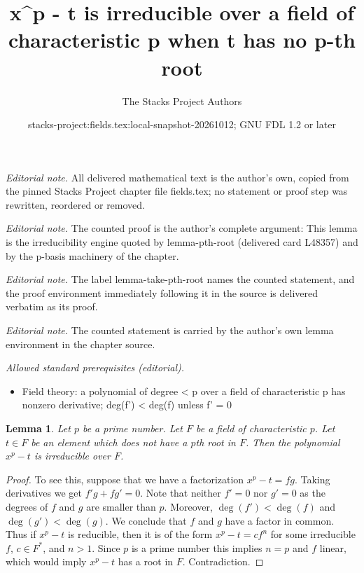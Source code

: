 \documentclass[10pt,a4paper]{amsart}
\title{x\textasciicircum{}p - t is irreducible over a field of characteristic p when t has no p-th root}
\author{The Stacks Project Authors}
\date{stacks-project:fields.tex:local-snapshot-20261012; GNU FDL 1.2 or later}
\theoremstyle{plain}
\newtheorem{lemma}[subsection]{Lemma}
\theoremstyle{definition}
\theoremstyle{remark}
\numberwithin{equation}{subsection}
\begin{document}
\maketitle
\noindent\textit{Editorial note.} All delivered mathematical text is the author's own, copied from the pinned Stacks Project chapter file fields.tex; no statement or proof step was rewritten, reordered or removed.\par\medskip
\noindent\textit{Editorial note.} The counted proof is the author's complete argument: This lemma is the irreducibility engine quoted by lemma-pth-root (delivered card L48357) and by the p-basis machinery of the chapter.\par\medskip
\noindent\textit{Editorial note.} The label lemma-take-pth-root names the counted statement, and the proof environment immediately following it in the source is delivered verbatim as its proof.\par\medskip
\noindent\textit{Editorial note.} The counted statement is carried by the author's own lemma environment in the chapter source.\par\medskip
\noindent\textit{Allowed standard prerequisites (editorial).}\begin{itemize}
\item Field theory: a polynomial of degree < p over a field of characteristic p has nonzero derivative; deg(f') < deg(f) unless f' = 0
\end{itemize}\medskip
\begin{lemma}
\label{lemma-take-pth-root}
Let $p$ be a prime number. Let $F$ be a field of characteristic $p$.
Let $t \in F$ be an element which does not have a $p$th root in $F$.
Then the polynomial $x^p - t$ is irreducible over $F$.
\end{lemma}

\begin{proof}
To see this, suppose that we have a factorization
$x^p - t = f g$. Taking derivatives we get $f' g + f g' = 0$.
Note that neither $f' = 0$ nor $g' = 0$ as the degrees of $f$ and $g$
are smaller than $p$. Moreover, $\deg(f') < \deg(f)$ and $\deg(g') < \deg(g)$.
We conclude that $f$ and $g$ have a factor in common. Thus if $x^p - t$
is reducible, then it is of the form $x^p - t = c f^n$ for some irreducible
$f$, $c \in F^*$, and $n > 1$. Since $p$ is a prime number this
implies $n = p$ and $f$ linear, which would imply $x^p - t$ has a root
in $F$. Contradiction.
\end{proof}
\end{document}
